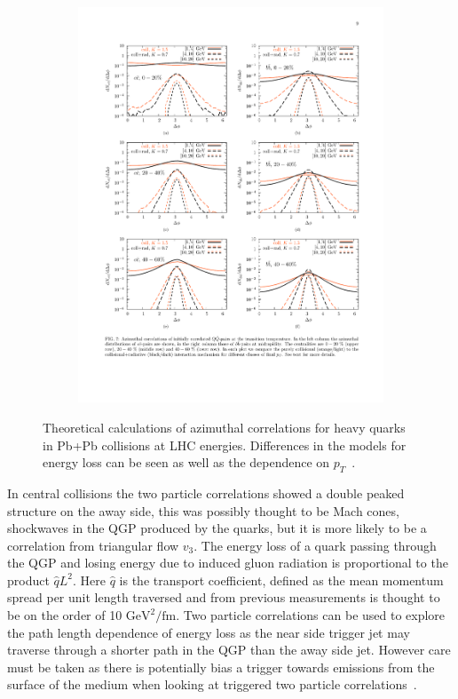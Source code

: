\begin{figure}[htbp]
\begin{center}
\begin{subfigure}{0.75\textwidth}
        \includegraphics[width=\textwidth]{Plots/Intro/bb_cent.pdf}
        \caption{}
        \label{fig:bbbarcent}
    \end{subfigure}
	\end{center}
\caption[Correlations $c$ and $b$ at LHC Energies]{Theoretical calculations of azimuthal correlations for heavy quarks in Pb+Pb collisions at LHC energies. Differences in the models for energy loss can be seen as well as the dependence on $p_{T}$~\cite{qqazi}.}
\label{fig:qqcorr}
\end{figure}

In central collisions the two particle correlations showed a double peaked structure on the away side, this was possibly thought to be Mach cones, shockwaves in the QGP produced by the quarks, but it is more likely to be a correlation from triangular flow $v_3$. The energy loss of a quark passing through the QGP and losing energy due to induced gluon radiation is proportional to the product $\hat{q}L^2$. Here $\hat{q}$ is the transport coefficient, defined as the mean momentum spread per unit length traversed and from previous measurements is thought to be on the order of 10 $\text{GeV}^2/\text{fm}$. Two particle correlations can be used to explore the path length dependence of energy loss as the near side trigger jet may traverse through a shorter path in the QGP than the away side jet. However care must be taken as there is potentially bias a trigger towards emissions from the surface of the medium when looking at triggered two particle correlations~\cite{biasshower}. 

